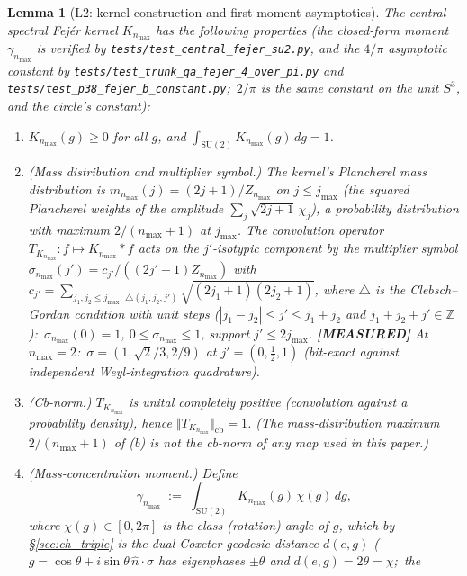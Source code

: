 \documentclass[11pt,a4paper]{article}
\theoremstyle{plain}
\newtheorem{lemma}[theorem]{Lemma}
\theoremstyle{definition}
\newcommand{\nmax}{n_{\max}}
\newcommand{\sthree}{S^{3}}
\newcommand{\SU}{\mathrm{SU}}
\newcommand{\KS}{K}
\begin{document}
\begin{lemma}[L2: kernel construction and first-moment asymptotics]\label{lem:L2}
The central spectral Fej\'er kernel $\KS_{\nmax}$ has the following
properties (the closed-form moment $\gamma_{\nmax}$ is verified by
\texttt{tests/test\_central\_fejer\_su2.py}, and the $4/\pi$ asymptotic
constant by \texttt{tests/test\_trunk\_qa\_fejer\_4\_over\_pi.py} and
\texttt{tests/test\_p38\_fejer\_b\_constant.py};\ $2/\pi$
is the same constant on the unit $\sthree$, and the circle's constant):
\begin{enumerate}\setlength{\itemsep}{2pt}
\item[(a)] $\KS_{\nmax}(g) \ge 0$ for all $g$, and $\int_{\SU(2)}
\KS_{\nmax}(g) \, dg = 1$.
\item[(b)] (Mass distribution and multiplier symbol.) The kernel's Plancherel \emph{mass distribution} is
$m_{\nmax}(j) = (2j+1)/Z_{\nmax}$ on $j \le j_{\max}$ (the squared
Plancherel weights of the amplitude
$\sum_{j}\sqrt{2j+1}\,\chi_{j}$), a probability distribution with
maximum $2/(\nmax+1)$ at $j_{\max}$. The convolution operator
$T_{\KS_{\nmax}} : f \mapsto \KS_{\nmax} \ast f$ acts on the
$j'$-isotypic component by the \emph{multiplier symbol}
$\sigma_{\nmax}(j') = c_{j'} / ((2j'+1) Z_{\nmax})$ with
$c_{j'} = \sum_{j_1, j_2 \le j_{\max},\, \triangle(j_1, j_2, j')}
\sqrt{(2j_1+1)(2j_2+1)}$, where $\triangle$ is the Clebsch--Gordan
condition \emph{with unit steps} ($|j_1 - j_2| \le j' \le j_1 + j_2$
and $j_1 + j_2 + j' \in \mathbb{Z}$):\
$\sigma_{\nmax}(0) = 1$, $0 \le \sigma_{\nmax} \le 1$, support
$j' \le 2j_{\max}$. \textbf{[MEASURED]} At $\nmax = 2$:\
$\sigma = (1, \sqrt2/3, 2/9)$ at $j' = (0, \tfrac12, 1)$
(bit-exact against independent Weyl-integration quadrature).
\item[(c)] (Cb-norm.) $T_{\KS_{\nmax}}$
is unital completely positive (convolution against a probability
density), hence $\Vert T_{\KS_{\nmax}}\Vert_{\mathrm{cb}} = 1$. (The
mass-distribution maximum $2/(\nmax+1)$ of (b) is \emph{not} the
cb-norm of any map used in this paper.)
\item[(d)] (Mass-concentration moment.) Define
\begin{equation}\label{eq:gamma_def}
   \gamma_{\nmax}
   \;:=\; \int_{\SU(2)} \KS_{\nmax}(g)\, \chi(g)\, dg,
\end{equation}
where $\chi(g) \in [0, 2\pi]$ is the class (rotation) angle of $g$,
which by \S\ref{sec:ch_triple} \emph{is} the dual-Coxeter geodesic
distance $d(e, g)$ ($g = \cos\theta + i \sin\theta\, \hat n \cdot
\sigma$ has eigenphases $\pm\theta$ and $d(e,g) = 2\theta = \chi$;\ the

\end{enumerate}
\end{lemma}
\end{document}
